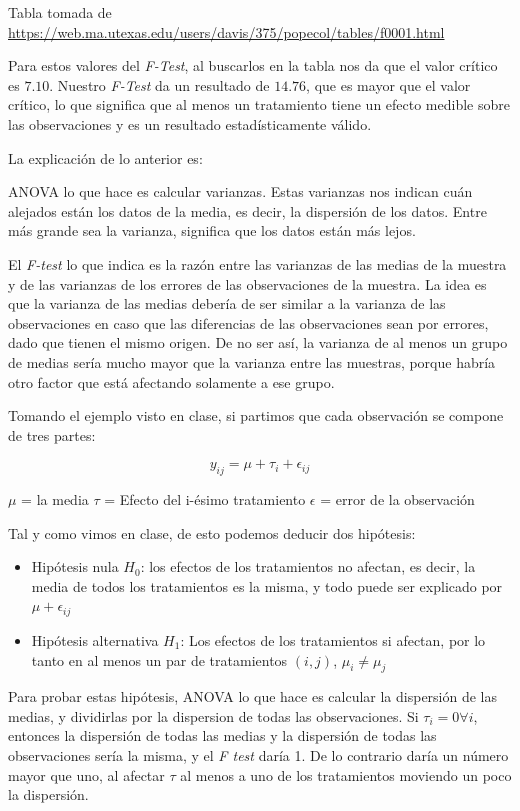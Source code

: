 \documentclass[]{article}
\providecommand{\tightlist}{%
  \setlength{\itemsep}{0pt}\setlength{\parskip}{0pt}}
\begin{document}
Tabla tomada de
\url{https://web.ma.utexas.edu/users/davis/375/popecol/tables/f0001.html}

Para estos valores del \emph{F-Test}, al buscarlos en la tabla nos da
que el valor crítico es \(7.10\). Nuestro \emph{F-Test} da un resultado
de \(14.76\), que es mayor que el valor crítico, lo que significa que al
menos un tratamiento tiene un efecto medible sobre las observaciones y
es un resultado estadísticamente válido.

La explicación de lo anterior es:

ANOVA lo que hace es calcular varianzas. Estas varianzas nos indican
cuán alejados están los datos de la media, es decir, la dispersión de
los datos. Entre más grande sea la varianza, significa que los datos
están más lejos.

El \emph{F-test} lo que indica es la razón entre las varianzas de las
medias de la muestra y de las varianzas de los errores de las
observaciones de la muestra. La idea es que la varianza de las medias
debería de ser similar a la varianza de las observaciones en caso que
las diferencias de las observaciones sean por errores, dado que tienen
el mismo origen. De no ser así, la varianza de al menos un grupo de
medias sería mucho mayor que la varianza entre las muestras, porque
habría otro factor que está afectando solamente a ese grupo.

Tomando el ejemplo visto en clase, si partimos que cada observación se
compone de tres partes:

\[ y_{ij} = \mu + \tau_i + \epsilon_{ij} \]

\(\mu\) = la media \(\tau\) = Efecto del i-ésimo tratamiento
\(\epsilon\) = error de la observación

Tal y como vimos en clase, de esto podemos deducir dos hipótesis:

\begin{itemize}
\tightlist
\item
  Hipótesis nula \(H_0\): los efectos de los tratamientos no afectan, es
  decir, la media de todos los tratamientos es la misma, y todo puede
  ser explicado por \(\mu + \epsilon_{ij}\)
\item
  Hipótesis alternativa \(H_1\): Los efectos de los tratamientos si
  afectan, por lo tanto en al menos un par de tratamientos \((i,j)\),
  \(\mu_i \neq \mu_j\)
\end{itemize}

Para probar estas hipótesis, ANOVA lo que hace es calcular la dispersión
de las medias, y dividirlas por la dispersion de todas las
observaciones. Si \(\tau_i=0 \forall i\), entonces la dispersión de
todas las medias y la dispersión de todas las observaciones sería la
misma, y el \emph{F test} daría 1. De lo contrario daría un número mayor
que uno, al afectar \(\tau\) al menos a uno de los tratamientos moviendo
un poco la dispersión.
\end{document}
